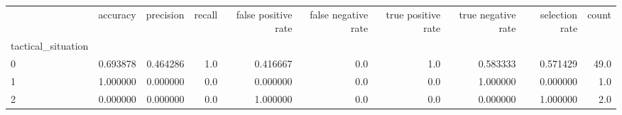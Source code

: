 \begin{tabular}{lrrrrrrrrr}
\toprule
{} &  accuracy &  precision &  recall &  false positive rate &  false negative rate &  true positive rate &  true negative rate &  selection rate &  count \\
tactical\_situation &           &            &         &                      &                      &                     &                     &                 &        \\
\midrule
0                  &  0.693878 &   0.464286 &     1.0 &             0.416667 &                  0.0 &                 1.0 &            0.583333 &        0.571429 &   49.0 \\
1                  &  1.000000 &   0.000000 &     0.0 &             0.000000 &                  0.0 &                 0.0 &            1.000000 &        0.000000 &    1.0 \\
2                  &  0.000000 &   0.000000 &     0.0 &             1.000000 &                  0.0 &                 0.0 &            0.000000 &        1.000000 &    2.0 \\
\bottomrule
\end{tabular}
